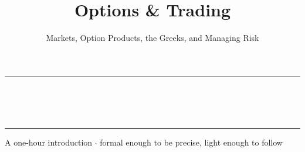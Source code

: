 \documentclass[11pt,aspectratio=169]{beamer}
\title[Options \& Trading]{Options \& Trading}
\subtitle{Markets, Option Products, the Greeks, and Managing Risk}
\author{}
\date{}
\begin{document}
\begin{frame}[plain]
  \vspace{1.2em}
  \begin{center}
    {\color{accent}\rule{0.6\textwidth}{1.4pt}}\\[0.9em]
    {\inserttitle}\\[0.5em]
    {\large\color{muted}\insertsubtitle}\\[1.1em]
    {\color{accent}\rule{0.6\textwidth}{1.4pt}}
  \end{center}
  \vfill
  \begin{center}
    \small\color{muted}A one-hour introduction \;$\cdot$\; formal enough to be precise, light enough to follow
  \end{center}
  \vspace{1.0em}
\end{frame}
\end{document}
